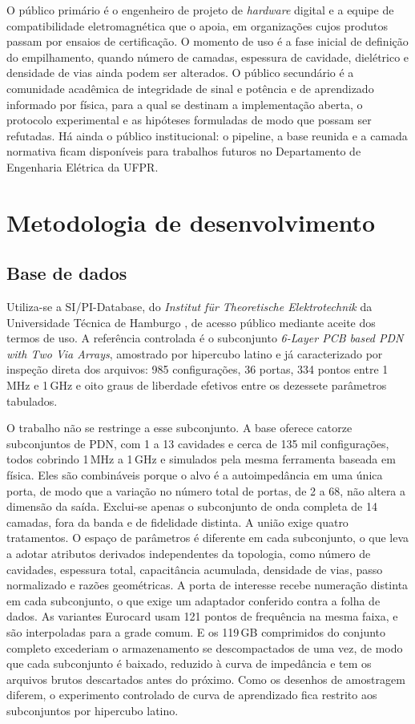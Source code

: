 O público primário é o engenheiro de projeto de \textit{hardware} digital e a equipe
de compatibilidade eletromagnética que o apoia, em organizações cujos produtos
passam por ensaios de certificação. O momento de uso é a fase inicial de definição
do empilhamento, quando número de camadas, espessura de cavidade, dielétrico e
densidade de vias ainda podem ser alterados. O público secundário é a comunidade
acadêmica de integridade de sinal e potência e de aprendizado informado por física,
para a qual se destinam a implementação aberta, o protocolo experimental e as
hipóteses formuladas de modo que possam ser refutadas. Há ainda o público
institucional: o pipeline, a base reunida e a camada normativa ficam disponíveis
para trabalhos futuros no Departamento de Engenharia Elétrica da UFPR.

\section{Metodologia de desenvolvimento}
\label{sec:metodologia}

\subsection{Base de dados}
\label{subsec:harmonizacao}

Utiliza-se a SI/PI-Database, do \textit{Institut für Theoretische Elektrotechnik} da
Universidade Técnica de Hamburgo \citep{schierholz2021,hillebrecht2024}, de acesso
público mediante aceite dos termos de uso. A referência controlada é o subconjunto
\textit{6-Layer PCB based PDN with Two Via Arrays}, amostrado por hipercubo latino e
já caracterizado por inspeção direta dos arquivos: 985 configurações, 36 portas, 334
pontos entre 1\,MHz e 1\,GHz e oito graus de liberdade efetivos entre os dezessete
parâmetros tabulados.

O trabalho não se restringe a esse subconjunto. A base oferece catorze subconjuntos
de PDN, com 1 a 13 cavidades e cerca de 135 mil configurações, todos cobrindo 1\,MHz
a 1\,GHz e simulados pela mesma ferramenta baseada em física. Eles são combináveis
porque o alvo é a autoimpedância em uma única porta, de modo que a variação no
número total de portas, de 2 a 68, não altera a dimensão da saída. Exclui-se apenas
o subconjunto de onda completa de 14 camadas, fora da banda e de fidelidade
distinta. A união exige quatro tratamentos. O espaço de parâmetros é diferente em
cada subconjunto, o que leva a adotar atributos derivados independentes da
topologia, como número de cavidades, espessura total, capacitância acumulada,
densidade de vias, passo normalizado e razões geométricas. A porta de interesse
recebe numeração distinta em cada subconjunto, o que exige um adaptador conferido
contra a folha de dados. As variantes Eurocard usam 121 pontos de frequência na
mesma faixa, e são interpoladas para a grade comum. E os 119\,GB comprimidos do
conjunto completo excederiam o armazenamento se descompactados de uma vez, de modo
que cada subconjunto é baixado, reduzido à curva de impedância e tem os arquivos
brutos descartados antes do próximo. Como os desenhos de amostragem diferem, o
experimento controlado de curva de aprendizado fica restrito aos subconjuntos por
hipercubo latino.

